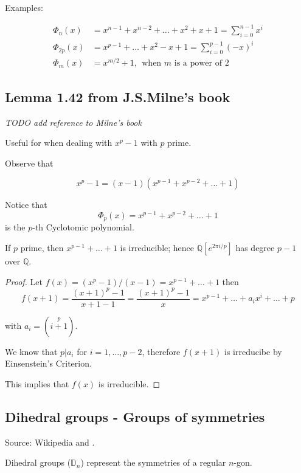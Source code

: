 \documentclass{article}
\theoremstyle{definition}
\newenvironment{lemma}[1]
{\renewcommand\theinnerlemma{#1}\innerlemma}
{\endinnerlemma}
\begin{document}
Examples:

\begin{align*}
  \Phi_n(x) &= x^{n-1} + x^{n-2} + \ldots + x^2 + x + 1 = \sum_{i=0}^{n-1} x^i\\
  \Phi_{2p}(x) &= x^{p-1} + \ldots + x^2 - x + 1 = \sum_{i=0}^{p-1} (-x)^i\\
  \Phi_m(x) &= x^{m/2} + 1, ~~\text{when $m$ is a power of $2$}
\end{align*}


\subsection{Lemma 1.42 from J.S.Milne's book}
\emph{TODO add reference to Milne's book}

Useful for when dealing with $x^p - 1$ with $p$ prime.

Observe that

$$x^p -1 = (x-1)(x^{p-1} + x^{p-2} + \ldots + 1)$$

Notice that
$$\Phi_p(x) = x^{p-1} + x^{p-2} + \ldots + 1$$
is the $p$-th Cyclotomic polynomial.

\begin{lemma}{1.42}
  If $p$ prime, then $x^{p-1} + \ldots + 1$ is irreducible; hence $\mathbb{Q}[e^{2 \pi i /p}]$ has degree $p-1$ over $\mathbb{Q}$.
\end{lemma}
\begin{proof}
  Let $f(x) = (x^p - 1)/(x-1) = x^{p-1} + \ldots + 1$
  then
  $$
  f(x+1) = \frac{(x+1)^p -1}{x+1-1} = \frac{(x+1)^p -1}{x} = x^{p-1} + \ldots + a_i x^i + \ldots + p
  $$

  with $a_i = \left( \stackrel{p}{i+1} \right)$.

  We know that $p | a_i$ for $i= 1, \ldots, p-2$, therefore $f(x+1)$ is irreducibe by Einsenstein's Criterion.

  This implies that $f(x)$ is irreducible.
\end{proof}


\subsection{Dihedral groups - Groups of symmetries} \label{dihedral}
Source: Wikipedia and \cite{dihedral}.

Dihedral groups ($\mathbb{D}_n$) represent the symmetries of a regular $n$-gon.
\end{document}
